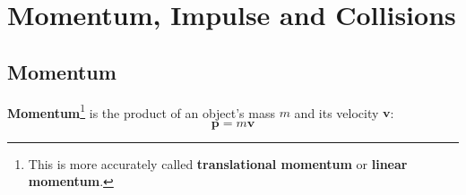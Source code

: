 \chapter{Momentum, Impulse and Collisions}
\label{chapter:momentum}

%
%
%
%
%
%
%
%
%
%
%
%

\section{Momentum}
\textbf{Momentum}\footnote{This is more accurately called
\textbf{translational momentum} or \textbf{linear momentum}.} is the product
of an object's mass $m$ and its velocity $\bm v$:
\begin{equation}
  \boxed{\bm p=m\bm v}
\end{equation}

